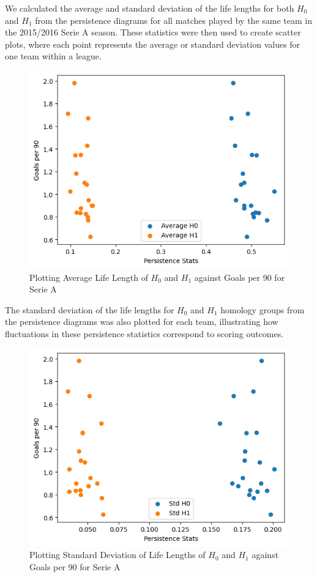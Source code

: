 \documentclass[10pt,twocolumn]{article}
\begin{document}
We calculated the average and standard deviation of the life lengths for both $ H_0 $ and $ H_1 $ from the persistence diagrams for all matches played by the same team in the 2015/2016 Serie A season. These statistics were then used to create scatter plots, where each point represents the average or standard deviation values for one team within a league.

\begin{figure}[H]
    \centering
    \includegraphics[width=1\linewidth]{images/avg_H0_vs_gp90_serie_A.png}
    \caption{Plotting Average Life Length of $ H_0 $ and $ H_1 $ against Goals per 90 for Serie A}
    \label{fig:avg_life_vs_gp90_serie_A}
\end{figure}

The standard deviation of the life lengths for $ H_0 $ and $ H_1 $ homology groups from the persistence diagrams was also plotted for each team, illustrating how fluctuations in these persistence statistics correspond to scoring outcomes.

\begin{figure}[H]
    \includegraphics[width=1\linewidth]{images/std_H0_vs_gp90_serie_A.png}
    \caption{Plotting Standard Deviation of Life Lengths of $ H_0 $ and $ H_1 $ against Goals per 90 for Serie A}
    \label{fig:std_life_vs_gp90_serie_A}
\end{figure}
\end{document}
